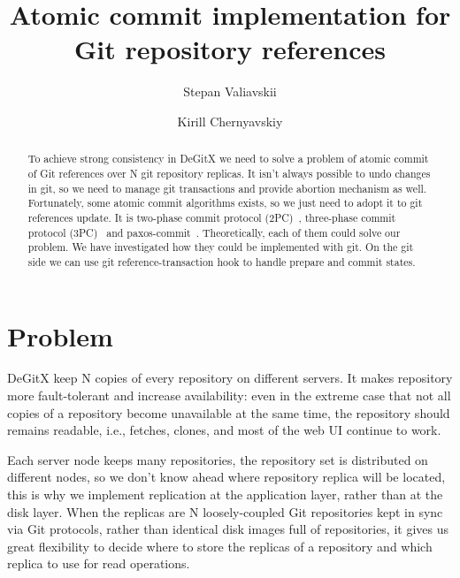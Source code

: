 \documentclass[sigplan, screen, nonacm, 11pt]{acmart}
\title{Atomic commit implementation for Git repository references}
\author{Stepan Valiavskii}
\author{Kirill Chernyavskiy}
\begin{document}
\begin{abstract}
  To achieve strong consistency in DeGitX we need to solve a problem of atomic commit of Git references
  over N git repository replicas.
  It isn't always possible to undo changes in git, so we need to manage git transactions
  and provide abortion mechanism as well.
  Fortunately, some atomic commit algorithms exists, so we just need to adopt it to git references update.
  It is two-phase commit protocol (2PC)~\cite{2pc}, three-phase commit protocol (3PC)~\cite{3pc} and paxos-commit~\cite{paxos-commit}.
  Theoretically, each of them could solve our problem.
  We have investigated how they could be implemented with git.
  On the git side we can use git reference-transaction hook to handle prepare and commit states.
\end{abstract}

\maketitle

\section{Problem}

DeGitX keep N copies of every repository on different servers.
It makes repository more fault-tolerant and increase availability:
even in the extreme case that not all copies of a repository become unavailable at
the same time, the repository should remains readable, i.e., fetches, clones, and
most of the web UI continue to work.

Each server node keeps many repositories, the repository set is distributed on different nodes,
so we don't know ahead where repository replica will be located, this is why
we implement replication at the application layer, rather than at the disk layer.
When the replicas are N loosely-coupled Git repositories kept
in sync via Git protocols, rather than identical disk images full of repositories,
it gives us great flexibility to decide where to
store the replicas of a repository and which replica to use for read operations.
\end{document}
